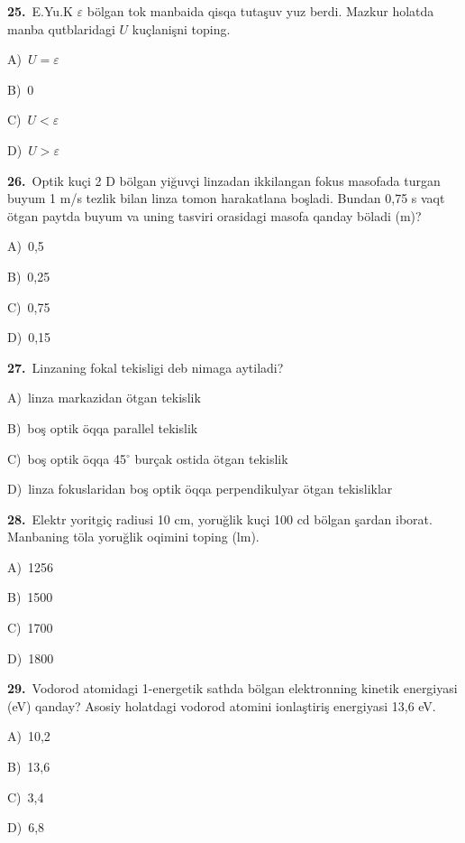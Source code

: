 \documentclass[11pt,a4paper]{article}
\newcommand{\opt}[2]{\hspace*{4mm}#1)\ #2\par}
\begin{document}
\noindent\begin{minipage}{\linewidth}
\textbf{25.}\ E.Yu.K $\varepsilon$ bölgan tok manbaida qisqa tutaşuv yuz berdi. Mazkur holatda manba qutblaridagi $U$ kuçlanişni toping.\par\smallskip
\opt{A}{$U=\varepsilon$}
\opt{B}{0}
\opt{C}{$U<\varepsilon$}
\opt{D}{$U>\varepsilon$}
\end{minipage}\vspace{9pt}\par
\noindent\begin{minipage}{\linewidth}
\textbf{26.}\ Optik kuçi 2 D bölgan yiğuvçi linzadan ikkilangan fokus masofada turgan buyum 1 m/s tezlik bilan linza tomon harakatlana boşladi. Bundan 0,75 s vaqt ötgan paytda buyum va uning tasviri orasidagi masofa qanday böladi (m)?\par\smallskip
\opt{A}{0,5}
\opt{B}{0,25}
\opt{C}{0,75}
\opt{D}{0,15}
\end{minipage}\vspace{9pt}\par
\noindent\begin{minipage}{\linewidth}
\textbf{27.}\ Linzaning fokal tekisligi deb nimaga aytiladi?\par\smallskip
\opt{A}{linza markazidan ötgan tekislik}
\opt{B}{boş optik öqqa parallel tekislik}
\opt{C}{boş optik öqqa 45$^\circ$ burçak ostida ötgan tekislik}
\opt{D}{linza fokuslaridan boş optik öqqa perpendikulyar ötgan tekisliklar}
\end{minipage}\vspace{9pt}\par
\noindent\begin{minipage}{\linewidth}
\textbf{28.}\ Elektr yoritgiç radiusi 10 cm, yoruğlik kuçi 100 cd bölgan şardan iborat. Manbaning töla yoruğlik oqimini toping (lm).\par\smallskip
\opt{A}{1256}
\opt{B}{1500}
\opt{C}{1700}
\opt{D}{1800}
\end{minipage}\vspace{9pt}\par
\noindent\begin{minipage}{\linewidth}
\textbf{29.}\ Vodorod atomidagi 1-energetik sathda bölgan elektronning kinetik energiyasi (eV) qanday? Asosiy holatdagi vodorod atomini ionlaştiriş energiyasi 13,6 eV.\par\smallskip
\opt{A}{10,2}
\opt{B}{13,6}
\opt{C}{3,4}
\opt{D}{6,8}
\end{minipage}\vspace{9pt}\par
\end{document}
